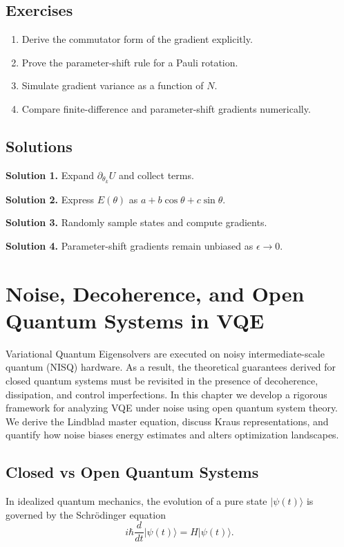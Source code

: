 \documentclass{book}
\begin{document}
\section{Exercises}

\begin{enumerate}
\item Derive the commutator form of the gradient explicitly.
\item Prove the parameter-shift rule for a Pauli rotation.
\item Simulate gradient variance as a function of $N$.
\item Compare finite-difference and parameter-shift gradients numerically.
\end{enumerate}

\section{Solutions}

\textbf{Solution 1.} Expand $\partial_{\theta_k} U$ and collect terms.

\textbf{Solution 2.} Express $E(\theta)$ as $a + b\cos\theta + c\sin\theta$.

\textbf{Solution 3.} Randomly sample states and compute gradients.

\textbf{Solution 4.} Parameter-shift gradients remain unbiased as $\epsilon \to 0$.




\chapter{Noise, Decoherence, and Open Quantum Systems in VQE}

Variational Quantum Eigensolvers are executed on noisy intermediate-scale quantum (NISQ) hardware. As a result, the theoretical guarantees derived for closed quantum systems must be revisited in the presence of decoherence, dissipation, and control imperfections. In this chapter we develop a rigorous framework for analyzing VQE under noise using open quantum system theory. We derive the Lindblad master equation, discuss Kraus representations, and quantify how noise biases energy estimates and alters optimization landscapes.

\section{Closed vs Open Quantum Systems}

In idealized quantum mechanics, the evolution of a pure state $|\psi(t)\rangle$ is governed by the Schrödinger equation
\begin{equation}
i\hbar \frac{d}{dt}|\psi(t)\rangle = H |\psi(t)\rangle.
\end{equation}
\end{document}
